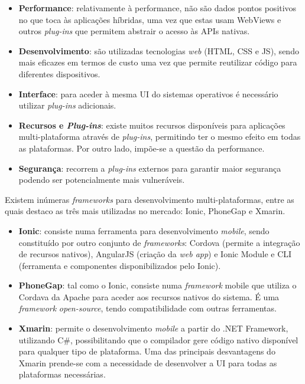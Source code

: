 \begin{itemize}
	\item \textbf{Performance}: relativamente à performance, não são dados pontos positivos no que toca às aplicações híbridas, uma vez que estas usam  WebViews e outros \textit{plug-ins} que permitem abstrair o acesso às APIs nativas. 

	
	\item \textbf{Desenvolvimento}: são utilizadas tecnologias \textit{web} (\ac{HTML}, \ac{CSS} e \ac{JS}), sendo mais eficazes em termos de custo uma vez que permite reutilizar código para diferentes dispositivos. 
	
	
	\item \textbf{Interface}: para aceder à mesma \ac{UI} do sistemas operativos é necessário utilizar \textit{plug-ins} adicionais. 
	
	
	\item \textbf{Recursos e \textit{Plug-ins}}: existe muitos recursos disponíveis  para aplicações \linebreak multi-plataforma através de \textit{plug-ins}, permitindo ter o mesmo efeito em todas as plataformas. Por outro lado, impõe-se a questão da performance. 

	
	\item \textbf{Segurança}: recorrem a \textit{plug-ins} externos para garantir maior segurança podendo ser potencialmente mais vulneráveis.
	
	
\end{itemize}

Existem inúmeras \textit{frameworks} para desenvolvimento multi-plataformas, entre as quais destaco as três mais utilizadas no mercado: Ionic, PhoneGap e Xmarin. 

\begin{itemize}
	\item \textbf{Ionic}: consiste numa ferramenta para desenvolvimento \textit{mobile}, sendo constituído por outro conjunto de \textit{frameworks}: Cordova (permite a integração de recursos nativos), AngularJS (criação da \textit{web app}) e Ionic Module e CLI (ferramenta e componentes disponibilizados pelo Ionic)\cite{Ionic2016}. 
	
	\item \textbf{PhoneGap}: tal como o Ionic, consiste numa \textit{framework} mobile que utiliza o Cordava da Apache para aceder aos recursos nativos do sistema. É uma \textit{framework} \textit{open-source}, tendo compatibilidade com outras ferramentas. 
	
	\item \textbf{Xmarin}: permite o desenvolvimento \textit{mobile} a partir do .NET Framework, utilizando C\#, possibilitando que o compilador gere código nativo disponível para qualquer tipo de plataforma. Uma das principais desvantagens do Xmarin prende-se com a necessidade de desenvolver a \ac{UI} para todas as plataformas necessárias. 
\end{itemize}
 


